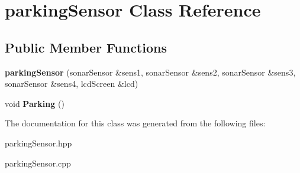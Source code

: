 \hypertarget{classparking_sensor}{}\section{parking\+Sensor Class Reference}
\label{classparking_sensor}
\subsection*{Public Member Functions}
\begin{DoxyCompactItemize}
\item 
{\bfseries parking\+Sensor} (sonar\+Sensor \&sens1, sonar\+Sensor \&sens2, sonar\+Sensor \&sens3, sonar\+Sensor \&sens4, lcd\+Screen \&lcd)\hypertarget{classparking_sensor_a512299c8545a7c50aa1933f066f57046}{}\label{classparking_sensor_a512299c8545a7c50aa1933f066f57046}

\item 
void {\bfseries Parking} ()\hypertarget{classparking_sensor_a470cd7b061ec7cfd21c7fbdcc6c8d9b5}{}\label{classparking_sensor_a470cd7b061ec7cfd21c7fbdcc6c8d9b5}

\end{DoxyCompactItemize}


The documentation for this class was generated from the following files\+:\begin{DoxyCompactItemize}
\item 
parking\+Sensor.\+hpp\item 
parking\+Sensor.\+cpp\end{DoxyCompactItemize}
